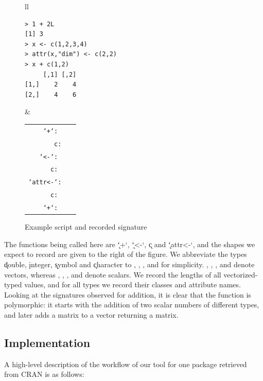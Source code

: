 \documentclass[acmsmall,10pt,review,anonymous]{acmart}\settopmatter{printfolios=true,printccs=false,printacmref=false}
\begin{document}
\begin{figure}[!hb]
\begin{tabular}{ll}\begin{minipage}{5cm}
{\small\begin{lstlisting}[style=R]
> 1 + 2L
[1] 3
> x <- c(1,2,3,4)
> attr(x,"dim") <- c(2,2)
> x + c(1,2)
     [,1] [,2]
[1,]    2    4
[2,]    4    6
\end{lstlisting}}
\end{minipage} &
\begin{minipage}{8cm}\small
\begin{tabular}{rl}
\tt `+`: &\tt \sD \sI \to \sD \\
\tt c:& \sD \sD \sD \sD \to \D\\
\tt `<-`: &\tt \sY \D \to \D\\
\tt c: & \tt \sD \sD \to \D\\
\tt `attr<-`:&\tt  \sY \C \D \to \\
\tt c: &\tt \sD \sD \to \D\\
\tt `+`: &\tt \attr\D{dim} \D \to \attr\D{dim}
\end{tabular}
\end{minipage}
\end{tabular}
\caption{Example script and recorded signature}\label{example}\end{figure}

The functions being called here are \k{`+`}, \k{`<-`}, \k{c} and
\k{`attr<-`}, and the shapes we expect to record are given to the right of the figure.
We abbreviate the types \k{double}, \k{integer}, \k{symbol} and \k{character} to \sD, \sI, \sY, and \sC for simplicity.
\D, \I, \Y, and \C denote vectors, whereas \sD, \sI, \sY, and \sC denote scalars.
We record the lengths of all vectorized-typed values, and for all types we record their classes and attribute names. 
Looking at the signatures observed for addition, it is clear that the function is polymorphic: it starts with the addition of two scalar numbers of different types, and later adds a matrix to a vector returning a matrix.

\subsection{Implementation}
\label{sec:Impl}

A high-level description of the workflow of our tool for one package
retrieved from CRAN is as follows:
\end{document}
